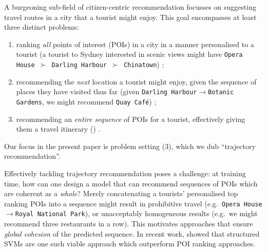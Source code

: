 
A burgeoning sub-field of citizen-centric recommendation focusses on suggesting travel routes in a city that a tourist might enjoy.
This goal encompasses at least three distinct problems:
\begin{enumerate}[(1)]
	\item ranking \emph{all} points of interest (POIs) in a city in a manner personalised to a tourist (\eg a tourist to Sydney interested in scenic views might have {\tt Opera House $\succ$ Darling Harbour $\succ$ Chinatown}) \citep{shi2011personalized,lian2014geomf,hsieh2014mining,yuan2014graph};
	\item recommending the \emph{next} location a tourist might enjoy, given the sequence of places they have visited thus far (\eg given {\tt Darling Harbour$\to$Botanic Gardens}, we might recommend {\tt Quay Caf\'{e}}) \citep{fpmc10,ijcai13,zhang2015location};
	\item recommending an \emph{entire sequence} of POIs for a tourist, effectively giving them a travel itinerary () \citep{lu2010photo2trip,ijcai15,lu2012personalized,gioniswsdm14,chen2015tripplanner}.
\end{enumerate}
Our focus in the present paper is problem setting (3), which we dub ``trajectory recommendation''.

Effectively tackling trajectory recommendation poses a challenge:
at training time, how can one design a model that can recommend sequences of POIs which are coherent as a \emph{whole}?
Merely concatenating a tourists' personalised top ranking POIs into a sequence
might result in prohibitive travel (e.g.\ {\tt Opera House$\to$Royal National Park}),
or unacceptably homogeneous results (e.g.\ we might recommend three restaurants in a row).
This motivates approaches that ensure \emph{global cohesion} of the predicted sequence.
In recent work, \citet{Chen:2017} showed that structured SVMs are one such viable approach which outperform POI ranking approaches. %

